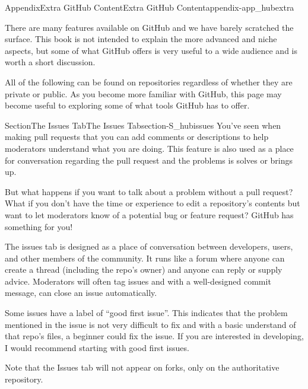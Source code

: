 \documentclass[twoside,10pt,]{book}
\begin{document}
\begin{appendixptx}{Appendix}{Extra GitHub Content}{}{Extra GitHub Content}{}{}{appendix-app_hubextra}
\renewcommand*{\appendixname}{Appendix}
%
\begin{introduction}{}%
There are many features available on GitHub and we have barely scratched the surface. This book is not intended to explain the more advanced and niche aspects, but some of what GitHub offers is very useful to a wide audience and is worth a short discussion.%
\par
All of the following can be found on repositories regardless of whether they are private or public. As you become more familiar with GitHub, this page may become useful to exploring some of what tools GitHub has to offer.%
\end{introduction}%
%
%
\typeout{************************************************}
\typeout{************************************************}
%
\begin{sectionptx}{Section}{The Issues Tab}{}{The Issues Tab}{}{}{section-S_hubissues}
%
%
You've seen when making pull requests that you can add comments or descriptions to help moderators understand what you are doing. This feature is also used as a place for conversation regarding the pull request and the problems is solves or brings up.%
\par
But what happens if you want to talk about a problem without a pull request? What if you don't have the time or experience to edit a repository's contents but want to let moderators know of a potential bug or feature request? GitHub has something for you!%
\par
The issues tab is designed as a place of conversation between developers, users, and other members of the community. It runs like a forum where anyone can create a thread (including the repo's owner) and anyone can reply or supply advice. Moderators will often tag issues and with a well-designed commit message, can close an issue automatically.%
\par
Some issues have a label of ``good first issue''. This indicates that the problem mentioned in the issue is not very difficult to fix and with a basic understand of that repo's files, a beginner could fix the issue. If you are interested in developing, I would recommend starting with good first issues.%
\par
Note that the Issues tab will not appear on forks, only on the authoritative repository.%

\end{sectionptx}
\end{appendixptx}
\end{document}
